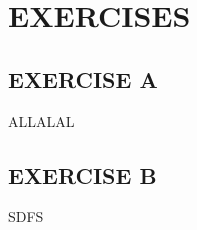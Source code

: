 \nolinenumbers

\section[Exercises]{EXERCISES}
\subsection*{EXERCISE A}

ALLALAL

\subsection*{EXERCISE B}
SDFS
